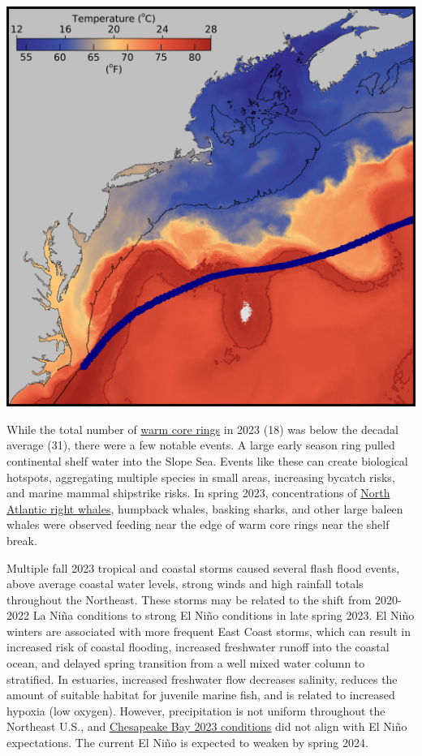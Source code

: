 \documentclass[
  10pt,
]{article}
\let\origfigure\figure
\let\endorigfigure\endfigure
\renewenvironment{figure}[1][2] {
    \expandafter\origfigure\expandafter[H]
} {
    \endorigfigure
}
\begin{document}
\begin{figure}

{\centering \includegraphics[width=0.6\linewidth]{SOE-NEFMC_files/figure-latex/gulf-stream-2023-1} 

}

\caption{October 8-14, 2023 sea surface temperature average derived from the Advanced Clear Sky Processor for Ocean (ACSPO) SST data. The black line depicts the 100 m isobath and the blue line is the mean path of the Gulf Stream.}\label{fig:gulf-stream-2023}
\end{figure}

While the total number of \href{https://noaa-edab.github.io/catalog/warm-core-rings.html}{warm core rings} in 2023 (18) was below the decadal average (31), there were a few notable events. A large early season ring pulled continental shelf water into the Slope Sea. Events like these can create biological hotspots, aggregating multiple species in small areas, increasing bycatch risks, and marine mammal shipstrike risks. In spring 2023, concentrations of \href{https://noaa-edab.github.io/catalog/persistent-annual-hotspots.html?q=hotspo\#persistent-annual-hotspots}{North Atlantic right whales}, humpback whales, basking sharks, and other large baleen whales were observed feeding near the edge of warm core rings near the shelf break.

Multiple fall 2023 tropical and coastal storms caused several flash flood events, above average coastal water levels, strong winds and high rainfall totals throughout the Northeast. These storms may be related to the shift from 2020-2022 La Niña conditions to strong El Niño conditions in late spring 2023. El Niño winters are associated with more frequent East Coast storms, which can result in increased risk of coastal flooding, increased freshwater runoff into the coastal ocean, and delayed spring transition from a well mixed water column to stratified. In estuaries, increased freshwater flow decreases salinity, reduces the amount of suitable habitat for juvenile marine fish, and is related to increased hypoxia (low oxygen). However, precipitation is not uniform throughout the Northeast U.S., and \href{https://noaa-edab.github.io/catalog/chesapeake-bay-salinity.html}{Chesapeake Bay 2023 conditions} did not align with El Niño expectations. The current El Niño is expected to weaken by spring 2024.
\end{document}
